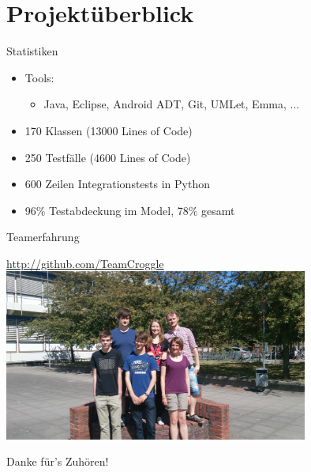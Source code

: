 \section{Projektüberblick}

\begin{frame}{Statistiken}
	\begin{itemize}
		\item Tools:
		\begin{itemize}
			\item Java, Eclipse, Android ADT, Git, UMLet, Emma, ...
		\end{itemize}
		\item 170 Klassen (13000 Lines of Code)
		\item 250 Testfälle (4600 Lines of Code)
		\item 600 Zeilen Integrationstests in Python
		\item 96\% Testabdeckung im Model, 78\% gesamt
	\end{itemize}
\end{frame}

\begin{frame}{Teamerfahrung}
	\begin{center}
		\textcolor{blue}{\href{http://github.com/TeamCroggle}{http://github.com/TeamCroggle}}
		\includegraphics[width=10cm,type=jpg,ext=.jpg,read=.jpg]{media/2014-06-24 10.56.29}
	\end{center}
\end{frame}

\begin{frame}
	\begin{center}
		\Huge
		Danke für's Zuhören!
	\end{center}
\end{frame}
